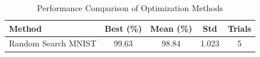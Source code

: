 \begin{table}[t]
\centering
\caption{Performance Comparison of Optimization Methods}
\label{tab:performance}
\begin{tabular}{lcccc}
\hline
\textbf{Method} & \textbf{Best (\%)} & \textbf{Mean (\%)} & \textbf{Std} & \textbf{Trials} \\
\hline
Random Search MNIST & 99.63 & 98.84 & 1.023 & 5 \\
\hline
\end{tabular}
\end{table}